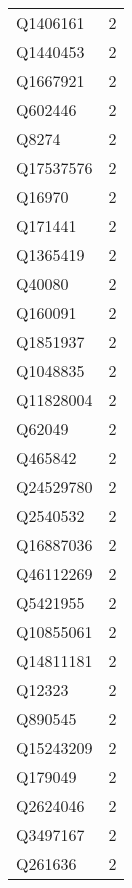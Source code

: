 \begin{tabular}{lr}
    Q1406161 &                             2 \\
    Q1440453 &                             2 \\
    Q1667921 &                             2 \\
     Q602446 &                             2 \\
       Q8274 &                             2 \\
   Q17537576 &                             2 \\
      Q16970 &                             2 \\
     Q171441 &                             2 \\
    Q1365419 &                             2 \\
      Q40080 &                             2 \\
     Q160091 &                             2 \\
    Q1851937 &                             2 \\
    Q1048835 &                             2 \\
   Q11828004 &                             2 \\
      Q62049 &                             2 \\
     Q465842 &                             2 \\
   Q24529780 &                             2 \\
    Q2540532 &                             2 \\
   Q16887036 &                             2 \\
   Q46112269 &                             2 \\
    Q5421955 &                             2 \\
   Q10855061 &                             2 \\
   Q14811181 &                             2 \\
      Q12323 &                             2 \\
     Q890545 &                             2 \\
   Q15243209 &                             2 \\
     Q179049 &                             2 \\
    Q2624046 &                             2 \\
    Q3497167 &                             2 \\
     Q261636 &                             2 \\

\end{tabular}
